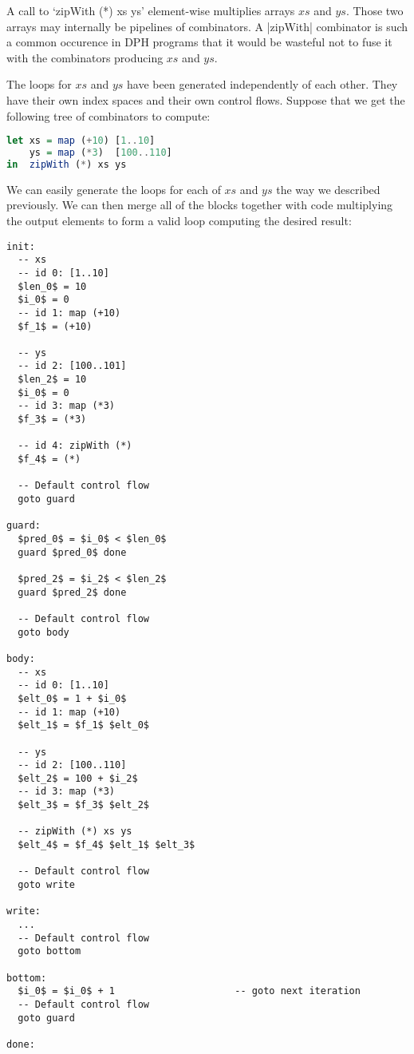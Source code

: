 A call to `zipWith (*) xs ys' element-wise multiplies arrays $xs$ and $ys$. Those two arrays may internally be pipelines of combinators. A |zipWith| combinator is such a common occurence in DPH programs that it would be wasteful not to fuse it with the combinators producing $xs$ and $ys$.


The loops for $xs$ and $ys$ have been generated independently of each other. They have their own index spaces and their own control flows. Suppose that we get the following tree of combinators to compute:

\begin{lstlisting}[language=haskell]
let xs = map (+10) [1..10]
    ys = map (*3)  [100..110]
in  zipWith (*) xs ys
\end{lstlisting}

We can easily generate the loops for each of $xs$ and $ys$ the way we described previously. We can then merge all of the blocks together with code multiplying the output elements to form a valid loop computing the desired result:

\begin{lstlisting}[mathescape]
init:
  -- xs
  -- id 0: [1..10]
  $len_0$ = 10
  $i_0$ = 0
  -- id 1: map (+10)
  $f_1$ = (+10)

  -- ys
  -- id 2: [100..101]
  $len_2$ = 10
  $i_0$ = 0
  -- id 3: map (*3)
  $f_3$ = (*3)

  -- id 4: zipWith (*)
  $f_4$ = (*)

  -- Default control flow
  goto guard

guard:
  $pred_0$ = $i_0$ < $len_0$
  guard $pred_0$ done

  $pred_2$ = $i_2$ < $len_2$
  guard $pred_2$ done

  -- Default control flow
  goto body

body:
  -- xs
  -- id 0: [1..10]
  $elt_0$ = 1 + $i_0$
  -- id 1: map (+10)
  $elt_1$ = $f_1$ $elt_0$

  -- ys
  -- id 2: [100..110]
  $elt_2$ = 100 + $i_2$
  -- id 3: map (*3)
  $elt_3$ = $f_3$ $elt_2$

  -- zipWith (*) xs ys
  $elt_4$ = $f_4$ $elt_1$ $elt_3$

  -- Default control flow
  goto write

write:
  ...
  -- Default control flow
  goto bottom

bottom:
  $i_0$ = $i_0$ + 1                     -- goto next iteration
  -- Default control flow
  goto guard

done:

\end{lstlisting}

